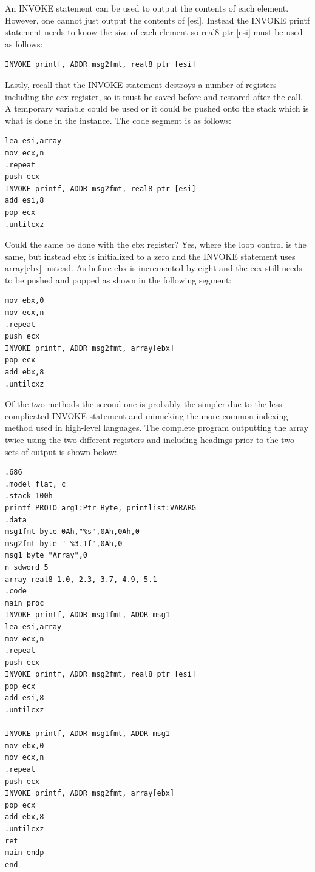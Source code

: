 \documentclass[10pt]{book}
\begin{document}
An INVOKE statement can be used to output the contents of each element. However, one cannot just output the contents of [esi]. Instead the INVOKE printf statement needs to know the size of each element so real8 ptr [esi] must be used as follows:

\begin{verbatim}
INVOKE printf, ADDR msg2fmt, real8 ptr [esi]
\end{verbatim}

Lastly, recall that the INVOKE statement destroys a number of registers including the ecx register, so it must be saved before and restored after the call. A temporary variable could be used or it could be pushed onto the stack which is what is done in the instance. The code segment is as follows:

\begin{verbatim}
lea esi,array
mov ecx,n
.repeat
push ecx
INVOKE printf, ADDR msg2fmt, real8 ptr [esi]
add esi,8
pop ecx
.untilcxz
\end{verbatim}

Could the same be done with the ebx register? Yes, where the loop control is the same, but instead ebx is initialized to a zero and the INVOKE statement uses array[ebx] instead. As before ebx is incremented by eight and the ecx still needs to be pushed and popped as shown in the following segment:

\begin{verbatim}
mov ebx,0
mov ecx,n
.repeat
push ecx
INVOKE printf, ADDR msg2fmt, array[ebx]
pop ecx
add ebx,8
.untilcxz
\end{verbatim}

Of the two methods the second one is probably the simpler due to the less complicated INVOKE statement and mimicking the more common indexing method used in high-level languages. The complete program outputting the array twice using the two different registers and including headings prior to the two sets of output is shown below:

\begin{verbatim}
.686
.model flat, c
.stack 100h
printf PROTO arg1:Ptr Byte, printlist:VARARG
.data
msg1fmt byte 0Ah,"%s",0Ah,0Ah,0
msg2fmt byte " %3.1f",0Ah,0
msg1 byte "Array",0
n sdword 5
array real8 1.0, 2.3, 3.7, 4.9, 5.1
.code
main proc
INVOKE printf, ADDR msg1fmt, ADDR msg1
lea esi,array
mov ecx,n
.repeat
push ecx
INVOKE printf, ADDR msg2fmt, real8 ptr [esi]
pop ecx
add esi,8
.untilcxz

INVOKE printf, ADDR msg1fmt, ADDR msg1
mov ebx,0
mov ecx,n
.repeat
push ecx
INVOKE printf, ADDR msg2fmt, array[ebx]
pop ecx
add ebx,8
.untilcxz
ret
main endp
end
\end{verbatim}
\end{document}
